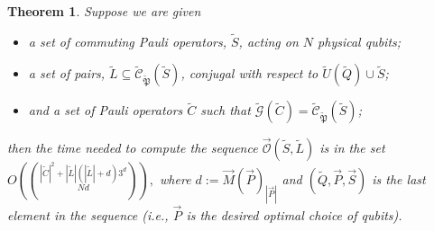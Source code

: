 \documentclass{amsbook}
\theoremstyle{plain}
\newtheorem{theorem}{Theorem}
\theoremstyle{definition}
\theoremstyle{remark}
\newcommand{\lst}{\vec}
\newcommand{\set}{\tilde}
\newcommand{\genfun}{\tilde{\mathcal{G}}}
\newcommand{\pauligroup}{{\set{\mathfrak{P}}}}
\newcommand{\centralizer}{\set{\mathcal{C}}}
\newcommand{\optimizer}{\lst{\mathcal{O}}}
\newcommand{\paren}[1]{\left(#1\right)}
\begin{document}
\begin{theorem}
\label{theorem:bound on running time}
Suppose we are given
\begin{itemize}
\item a set of commuting Pauli operators, $\set S$, acting on $N$ physical qubits;
\item a set of pairs, $\set L\subseteq\centralizer_\pauligroup(\set S)$, conjugal with respect to $\set U(\set Q)\cup\set S$;
\item and a set of Pauli operators $\set C$ such that $\genfun(\set C)=\centralizer_\pauligroup(\set S)$;
\end{itemize}
then the time needed to compute the sequence $\optimizer(\set S,\set L)$ is in the set $O\paren{|\set C|^2+|\set L|(|\set L|+d)3^d\choose{N}{d}},$ where $d:=\lst M(\lst P)_{|\lst P|}$ and $(\set Q,\lst P,\lst S)$ is the last element in the sequence (i.e., $\lst P$ is the desired optimal choice of qubits).
\end{theorem}
\end{document}
